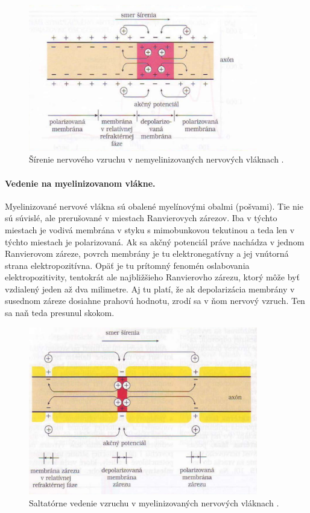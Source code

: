 \begin{figure}[!htbp]
  \centering
  \includegraphics[width=10cm]{img/nemyelin.png}
  \caption{Šírenie nervového vzruchu v nemyelinizovaných nervových vláknach \cite{javorkaLekarskaFyziologiaUcebnica2001}.}
  \label{nemyelin}
\end{figure}

\paragraph{Vedenie na myelinizovanom vlákne.}
Myelinizované nervové vlákna sú obalené myelínovými obalmi (pošvami). Tie nie sú súvislé, ale prerušované v miestach Ranvierovych zárezov. Iba v týchto miestach je vodivá membrána v styku s mimobunkovou 
tekutinou a teda len v týchto miestach je polarizovaná. Ak sa akčný potenciál práve nachádza v jednom Ranvierovom záreze, povrch membrány je tu elektronegatívny a jej vnútorná strana 
elektropozitívna. Opäť je tu prítomný fenomén oslabovania elektropozitivity, tentokrát ale najbližšieho Ranvierovho zárezu, ktorý môže byť vzdialený jeden až dva milimetre. Aj tu platí, že ak
depolarizácia membrány v susednom záreze dosiahne prahovú hodnotu, zrodí sa v ňom nervový vzruch. Ten sa naň teda presunul skokom. 

\begin{figure}[!htbp]
  \centering
  \includegraphics[width=10cm]{img/myelin.png}
  \caption{Saltatórne vedenie vzruchu v myelinizovaných nervových vláknach \cite{javorkaLekarskaFyziologiaUcebnica2001}.}
  \label{myelin}
\end{figure}	

